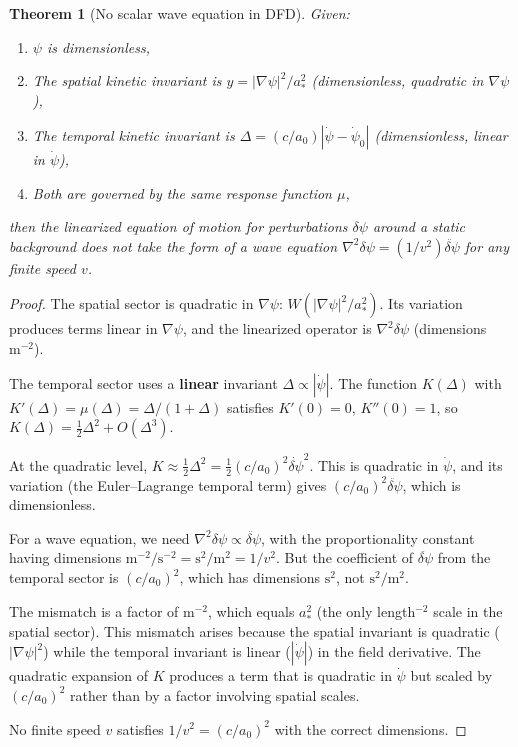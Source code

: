 \documentclass[11pt]{article}
\newtheorem{theorem}{Theorem}
\begin{document}
\begin{theorem}[No scalar wave equation in DFD]
\label{thm:no-wave}
Given:
\begin{enumerate}[nosep]
\item $\psi$ is dimensionless,
\item The spatial kinetic invariant is $y = |\nabla\psi|^2/a_*^2$ (dimensionless, quadratic in $\nabla\psi$),
\item The temporal kinetic invariant is $\Delta = (c/a_0)|\dot\psi - \dot\psi_0|$ (dimensionless, linear in $\dot\psi$),
\item Both are governed by the same response function $\mu$,
\end{enumerate}
then the linearized equation of motion for perturbations $\delta\psi$ around a static background does not take the form of a wave equation $\nabla^2\delta\psi = (1/v^2)\ddot{\delta\psi}$ for any finite speed $v$.
\end{theorem}

\begin{proof}
The spatial sector is quadratic in $\nabla\psi$: $W(|\nabla\psi|^2/a_*^2)$. Its variation produces terms linear in $\nabla\psi$, and the linearized operator is $\nabla^2\delta\psi$ (dimensions $\text{m}^{-2}$).

The temporal sector uses a \textbf{linear} invariant $\Delta \propto |\dot\psi|$. The function $K(\Delta)$ with $K'(\Delta) = \mu(\Delta) = \Delta/(1+\Delta)$ satisfies $K'(0) = 0$, $K''(0) = 1$, so $K(\Delta) = \frac{1}{2}\Delta^2 + O(\Delta^3)$.

At the quadratic level, $K \approx \frac{1}{2}\Delta^2 = \frac{1}{2}(c/a_0)^2\dot{\delta\psi}^2$. This is quadratic in $\dot\psi$, and its variation (the Euler--Lagrange temporal term) gives $(c/a_0)^2\ddot{\delta\psi}$, which is dimensionless.

For a wave equation, we need $\nabla^2\delta\psi \propto \ddot{\delta\psi}$, with the proportionality constant having dimensions $\text{m}^{-2}/\text{s}^{-2} = \text{s}^2/\text{m}^2 = 1/v^2$. But the coefficient of $\ddot{\delta\psi}$ from the temporal sector is $(c/a_0)^2$, which has dimensions $\text{s}^2$, not $\text{s}^2/\text{m}^2$.

The mismatch is a factor of $\text{m}^{-2}$, which equals $a_*^2$ (the only length$^{-2}$ scale in the spatial sector). This mismatch arises because the spatial invariant is quadratic ($|\nabla\psi|^2$) while the temporal invariant is linear ($|\dot\psi|$) in the field derivative. The quadratic expansion of $K$ produces a term that is quadratic in $\dot\psi$ but scaled by $(c/a_0)^2$ rather than by a factor involving spatial scales.

No finite speed $v$ satisfies $1/v^2 = (c/a_0)^2$ with the correct dimensions.
\end{proof}
\end{document}

